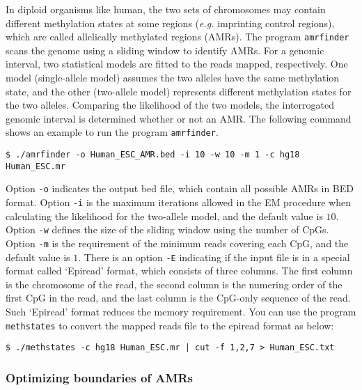 \documentclass[10pt]{article}
\newcommand{\prog}[1]{\texttt{#1}}
\newcommand{\op}[1]{\texttt{#1}}
\begin{document}
In diploid organisms like human, the two sets of chromosomes may
contain different methylation states at some regions ({\em e.g.}
imprinting control regions), which are called allelically methylated
regions (AMRs). The program \prog{amrfinder} scans the genome using a
sliding window to identify AMRs. For a genomic interval, two
statistical models are fitted to the reads mapped, respectively. One
model (single-allele model) assumes the two alleles have the same
methylation state, and the other (two-allele model) represents
different methylation states for the two alleles. Comparing the
likelihood of the two models, the interrogated genomic interval is
determined whether or not an AMR. The following command shows an
example to run the program \prog{amrfinder}.
\begin{verbatim}
$ ./amrfinder -o Human_ESC_AMR.bed -i 10 -w 10 -m 1 -c hg18 Human_ESC.mr
\end{verbatim}
Option \op{-o} indicates the output bed file, which contain all
possible AMRs in BED format. Option \op{-i} is the maximum iterations
allowed in the EM procedure when calculating the likelihood for the
two-allele model, and the default value is $10$. Option \op{-w}
defines the size of the sliding window using the number of
CpGs. Option \op{-m} is the requirement of the minimum reads covering
each CpG, and the default value is $1$. There is an option \op{-E}
indicating if the input file is in a special format called `Epiread'
format, which consists of three columns. The first column is the
chromosome of the read, the second column is the numering order of the
first CpG in the read, and the last column is the CpG-only sequence of
the read. Such `Epiread' format reduces the memory requirement. You
can use the program \prog{methstates} to convert the mapped reads file
to the epiread format as below:
\begin{verbatim}
$ ./methstates -c hg18 Human_ESC.mr | cut -f 1,2,7 > Human_ESC.txt
\end{verbatim}


\subsubsection{Optimizing boundaries of AMRs}
\end{document}
